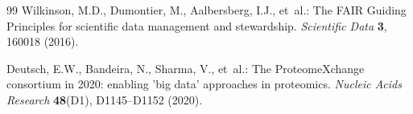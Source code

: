 \documentclass[11pt,twoside,openright]{book}
\begin{document}
\begin{thebibliography}{99}
Wilkinson, M.D., Dumontier, M., Aalbersberg, I.J., et~al.:
\newblock The {FAIR} Guiding Principles for scientific data management and stewardship.
\newblock \emph{Scientific Data} \textbf{3}, 160018 (2016).
\newblock {}

Deutsch, E.W., Bandeira, N., Sharma, V., et~al.:
\newblock The {ProteomeXchange} consortium in 2020: enabling 'big data' approaches in proteomics.
\newblock \emph{Nucleic Acids Research} \textbf{48}(D1), D1145--D1152 (2020).
\newblock {}

\end{thebibliography}
\end{document}
